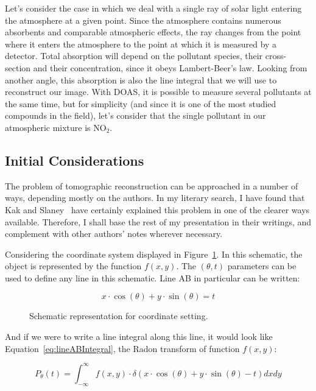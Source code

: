 Let's consider the case in which we deal with a single ray of solar
light entering the atmosphere at a given point. Since the atmosphere
contains numerous absorbents and comparable atmospheric effects, the ray
changes from the point where it enters the atmosphere to the point at
which it is measured by a detector. Total absorption will depend on the
pollutant species, their cross-section and their concentration, since it
obeys Lambert-Beer's law. Looking from another angle, this absorption
is also the line integral that we will use to reconstruct our image.
With \gls{DOAS}, it is possible to measure several pollutants at the
same time, but for simplicity (and since it is one of the most studied
compounds in the field), let's consider that the single pollutant in our
atmospheric mixture is NO$_2$.

\subsection{Initial Considerations}%
\label{sub:initial_considerations}


The problem of tomographic reconstruction can be approached in a number
of ways, depending mostly on the authors. In my literary search, I have
found that Kak and Slaney~\cite{Kak2001} have certainly explained this
problem in one of the clearer ways available. Therefore, I shall base
the rest of my presentation in their writings, and complement with other
authors' notes wherever necessary.

Considering the coordinate system displayed in
Figure~\ref{fig:coordinates}. In this schematic, the object is
represented by the function $f(x, y)$. The  $(\theta, t)$ parameters can
be used to define any line in this schematic. Line AB in particular can
be written:

\begin{equation}
    \label{eq:lineAB}
    x \cdot \cos(\theta) + y \cdot \sin(\theta) = t
\end{equation}

\begin{figure}[htpb]
    \centering
    \caption{Schematic representation for coordinate setting.}
    \label{fig:coordinates}
\end{figure}

And if we were to write a line integral along this line, it would look
like Equation~\ref{eq:lineABIntegral}, the Radon transform of function
$f(x, y)$:

\begin{equation}
    \label{eq:lineABIntegral}
    P_{\theta}(t) = \int_{-\infty}^{\infty} f(x, y) \cdot \delta(x \cdot
    \cos(\theta) + y \cdot \sin(\theta) - t) dxdy
\end{equation}

